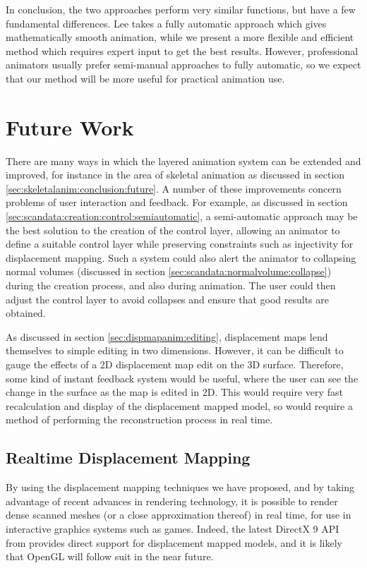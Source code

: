 In conclusion, the two approaches perform very similar functions, but have a few fundamental differences. Lee takes a fully automatic approach which gives mathematically smooth animation, while we present a more flexible and efficient method which requires expert input to get the best results. However, professional animators usually prefer semi-manual approaches to fully automatic, so we expect that our method will be more useful for practical animation use.

\section{\label{sec:conclusion:future}Future Work}

There are many ways in which the layered animation system can be extended and improved, for instance in the area of skeletal animation as discussed in section \ref{sec:skeletalanim:conclusion:future}.  A number of these improvements concern problems of user interaction and feedback. For example, as discussed in section \ref{sec:scandata:creation:control:semiautomatic}, a semi-automatic approach may be the best solution to the creation of the control layer, allowing an animator to define a suitable control layer while preserving constraints such as injectivity for displacement mapping. Such a system could also alert the animator to collapsing normal volumes (discussed in section \ref{sec:scandata:normalvolume:collapse}) during the creation process, and also during animation. The user could then adjust the control layer to avoid collapses and ensure that good results are obtained.

As discussed in section \ref{sec:dispmapanim:editing}, displacement maps lend themselves to simple editing in two dimensions. However, it can be difficult to gauge the effects of a 2D displacement map edit on the 3D surface. Therefore, some kind of instant feedback system would be useful, where the user can see the change in the surface as the map is edited in 2D. This would require very fast recalculation and display of the displacement mapped model, so would require a method of performing the reconstruction process in real time.

\subsection{\label{sec:conclusion:future:realtime}Realtime Displacement Mapping}

By using the displacement mapping techniques we have proposed, and by taking advantage of recent advances in rendering technology, it is possible to render dense scanned meshes (or a close approximation thereof) in real time, for use in interactive graphics systems such as games. Indeed, the latest DirectX 9 API from \citet{DirectX9} provides direct support for displacement mapped models, and it is likely that OpenGL \cite{OpenGL} will follow suit in the near future.

